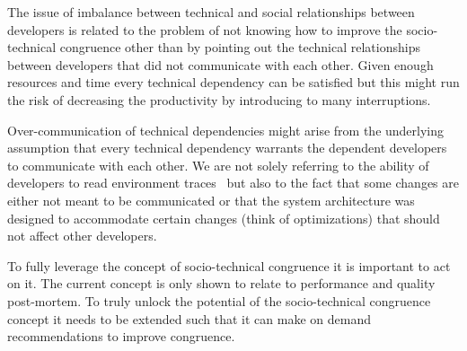 The issue of imbalance between technical and social relationships between developers is related to the problem of not knowing how to improve the socio-technical congruence other than by pointing out the technical relationships between developers that did not communicate with each other.
Given enough resources and time every technical dependency can be satisfied but this might run the risk of decreasing the productivity by introducing to many interruptions.

Over-communication of technical dependencies might arise from the underlying assumption that every technical dependency warrants the dependent developers to communicate with each other.
We are not solely referring to the ability of  developers to read environment traces~\cite{bolici:stc:2009} but also to the fact that some changes are either not meant to be communicated or that the system architecture was designed to accommodate certain changes (think of optimizations) that should not affect other developers.

To fully leverage the concept of socio-technical congruence it is important to act on it.
The current concept is only shown to relate to performance and quality post-mortem.
To truly unlock the potential of the socio-technical congruence concept it needs to be extended such that it can make on demand recommendations to improve congruence.


